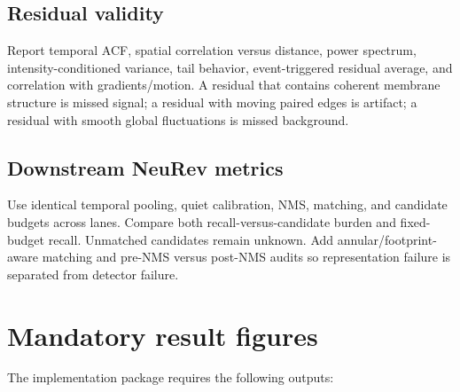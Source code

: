 \documentclass[11pt]{article}
\begin{document}
\subsection{Residual validity}

Report temporal ACF, spatial correlation versus distance, power spectrum,
intensity-conditioned variance, tail behavior, event-triggered residual average,
and correlation with gradients/motion. A residual that contains coherent
membrane structure is missed signal; a residual with moving paired edges is
artifact; a residual with smooth global fluctuations is missed background.

\subsection{Downstream NeuRev metrics}

Use identical temporal pooling, quiet calibration, NMS, matching, and candidate
budgets across lanes. Compare both recall-versus-candidate burden and fixed-budget
recall. Unmatched candidates remain unknown. Add annular/footprint-aware matching
and pre-NMS versus post-NMS audits so representation failure is separated from
detector failure.

\section{Mandatory result figures}

The implementation package requires the following outputs:
\end{document}
